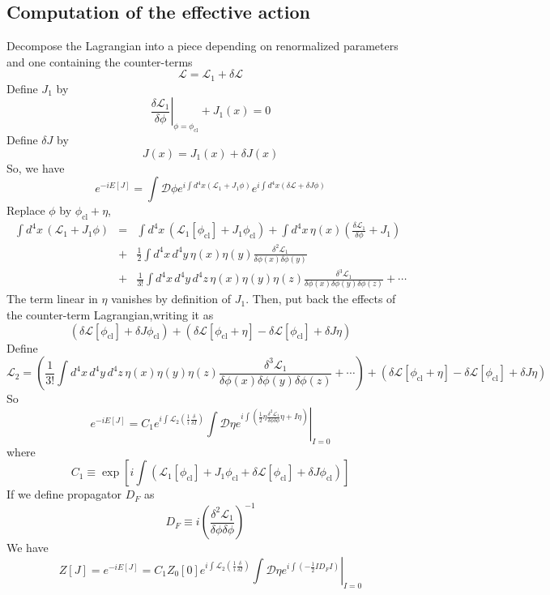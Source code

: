 \subsection{Computation of the effective action}
Decompose the Lagrangian into a piece depending on renormalized parameters and one containing the counter-terms
\[\mathcal{L} = \mathcal{L}_1 + \delta \mathcal{L}\]
Define $J_1$ by
\[\left. \frac{\delta \mathcal{L}_1}{\delta \phi} \right|_{\phi = \phi_{\mathrm{cl}}} + J_1(x) = 0\]
Define $\delta J$ by
\[J(x) = J_1(x) + \delta J(x)\]
So, we have
\[e^{-iE[J]} = \int \mathcal{D}\phi e^{i\int d^4x (\mathcal{L}_1 + J_1\phi)} e^{i\int d^4x (\delta \mathcal{L} + \delta J \phi)}\]
Replace $\phi$ by $\phi_{\mathrm{cl}}+\eta$,
\begin{eqnarray}
\int d^4x \, (\mathcal{L}_1 + J_1\phi) &=& \int d^4x \, (\mathcal{L}_1[\phi_{\mathrm{cl}}] + J_1\phi_{\mathrm{cl}}) + \int d^4x \, \eta(x) \left( \frac{\delta \mathcal{L}_1}{\delta \phi} + J_1 \right) \nonumber \\
&+& \frac{1}{2} \int d^4x \, d^4y \, \eta(x) \eta(y) \frac{\delta^2 \mathcal{L}_1}{\delta \phi(x) \delta \phi(y)} \nonumber \\
&+& \frac{1}{3!} \int d^4x \, d^4y \, d^4z \, \eta(x) \eta(y) \eta(z) \frac{\delta^3 \mathcal{L}_1}{\delta \phi(x) \delta \phi(y) \delta \phi(z)} + \cdots \nonumber
\end{eqnarray}
The term linear in $\eta$ vanishes by definition of $J_1$. 
Then, put back the effects of the counter-term Lagrangian,writing it as
\[(\delta \mathcal{L}[\phi_{\mathrm{cl}}] + \delta J \phi_{\mathrm{cl}} ) + ( \delta \mathcal{L}[\phi_{\mathrm{cl}} + \eta] - \delta\mathcal{L} [\phi_{\mathrm{cl}}] + \delta J \eta)\]
Define
\[\mathcal{L}_2 = \left(\frac{1}{3!} \int d^4x \, d^4y \, d^4z \, \eta(x) \eta(y) \eta(z) \frac{\delta^3 \mathcal{L}_1}{\delta \phi(x) \delta \phi(y) \delta \phi(z)} + \cdots \right) + ( \delta \mathcal{L}[\phi_{\mathrm{cl}} + \eta] - \delta\mathcal{L} [\phi_{\mathrm{cl}}] + \delta J \eta)\]
So
\[e^{-iE[J]} = C_1 e^{i\int \mathcal{L}_2(\frac{1}{i} \frac{\delta}{\delta I})} \left. \int \mathcal{D}\eta e^{i\int \left(\frac{1}{2} \eta \frac{\delta^2 \mathcal{L}_1}{\delta \phi \delta \phi} \eta + I\eta \right)} \right|_{I=0}\]
where
\[C_1 \equiv \exp \left[ i \int ( \mathcal{L}_1 [\phi_{\mathrm{cl}}] + J_1\phi_{\mathrm{cl}} + \delta \mathcal{L}[\phi_{\mathrm{cl}}] + \delta J \phi_{\mathrm{cl}} )\right]\]
If we define propagator $D_F$ as
\[D_F \equiv i \left( \frac{\delta^2 \mathcal{L}_1}{\delta \phi \delta \phi}\right)^{-1}\]
We have
\[Z[J] = e^{-iE[J]} =C_1 Z_0[0] e^{i\int \mathcal{L}_2(\frac{1}{i} \frac{\delta}{\delta I})} \left. \int \mathcal{D}\eta e^{i\int \left(-\frac{1}{2} I D_F I \right)} \right|_{I=0}\]
